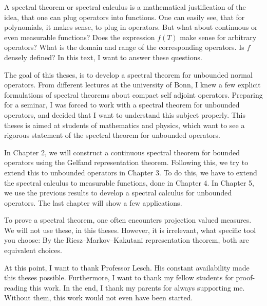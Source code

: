 \newpage

\vspace{.35cm}

\noindent

A spectral theorem or spectral calculus is a mathematical justification 
of the idea, that one can plug operators into functions. One can easily see,
that for polynomials, it makes sense, to plug in operators. But what about
continuous or even measurable functions? Does the expression $f(T)$ make 
sense for arbitrary operators? What is the domain and range of the corresponding
operators. Is $f$ densely defined? In this text, I want to answer these questions.

The goal of this theses, is to develop a spectral theorem for unbounded normal
operators. From different lectures at the university of Bonn, I knew a few explicit
formulations of spectral theorems about compact self adjoint operators. Preparing
for a seminar, I was forced to work with a spectral theorem for unbounded operators, 
and decided that I want to understand this subject properly. This theses is aimed
at students of mathematics and physics, which want to see a rigorous statement
of the spectral theorem for unbounded operators.

In Chapter 2, we will construct a continuous spectral theorem for bounded operators
using the Gelfand representation theorem. Following this, we try to extend this to unbounded
operators in Chapter 3. To do this, we have to extend the spectral calculus to measurable
functions, done in Chapter 4. In Chapter 5, we use the previous results to develop a spectral
calculus for unbounded operators. The last chapter will show a few applications.

To prove a spectral theorem, one often encounters projection valued measures. We will not 
use these, in this theses. However, it is irrelevant, what specific tool you choose:
By the Riesz--Markov--Kakutani representation theorem, both are equivalent choices.

At this point, I want to thank Professor Lesch. His constant availability made this theses possible.
Furthermore, I want to thank my fellow students for proof-reading this work. In the end, I thank
my parents for always supporting me. Without them, this work would not even have been started.



